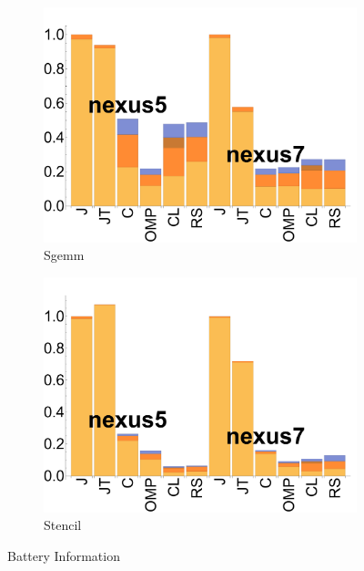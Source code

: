 \begin{figure}[tp]
  \begin{subfigure}[b]{0.24\textwidth}
      \centering
      \includegraphics[width=\textwidth]{data/bbattery_sgemm.pdf}
      \caption{Sgemm}\label{fig:b_Sgemm}
  \end{subfigure}

  \begin{subfigure}[b]{0.24\textwidth}
      \centering
      \includegraphics[width=\textwidth]{data/bbattery_stencil.pdf}
      \caption{Stencil} \label{fig:b_Stencil}
  \end{subfigure}

  \caption{Battery Information}
\end{figure}
\FloatBarrier



